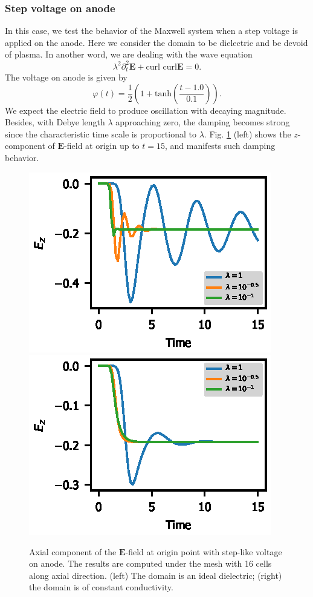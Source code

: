 \documentclass{report}
\begin{document}
\subsubsection{Step voltage on anode}
In this case, we test the behavior of the Maxwell system when a step voltage is applied on the anode. Here we consider the domain to be dielectric and be devoid of plasma. In another word, we are dealing with the wave equation
\begin{equation} \label{equ:wave_eq} 
    \lambda^2\partial^2_t\mathbf{E} + \text{curl curl}\mathbf{E} = 0.
\end{equation}
The voltage on anode is given by
\begin{equation*}
    \varphi(t) = \frac{1}{2}\left(1+\text{tanh}\left( \frac{t - 1.0}{0.1}\right) \right).
\end{equation*}
We expect the electric field to produce oscillation with decaying magnitude. Besides, with Debye length $\lambda$ approaching zero, the damping becomes strong since the characteristic time scale is proportional to $\lambda$. Fig. \ref{fig:maxwell_test} (left) shows the $z$-component of $\mathbf{E}$-field at origin up to $t = 15$, and manifests such damping behavior.  
\begin{figure}
    \centering
    \includegraphics{maxwell_test.eps}
    \includegraphics{maxwell_test2.eps}
    \caption{Axial component of the $\mathbf{E}$-field at origin point with step-like voltage on anode. The results are computed under the mesh with 16 cells along axial direction. (left) The domain is an ideal dielectric; (right) the domain is of constant conductivity.}
    \label{fig:maxwell_test}
\end{figure}
\end{document}
